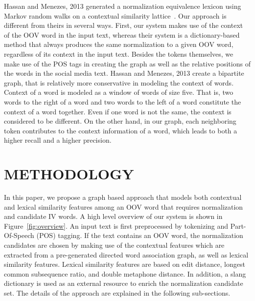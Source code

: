\documentclass[a4paper,onesided,12pt]{report}
\begin{document}
Hassan and Menezes, 2013 generated a normalization equivalence lexicon using Markov random walks on a contextual similarity lattice~\cite{DBLP:conf/acl/HassanM13}. Our approach is different from theirs in several ways. First, our system makes use of the context of the OOV word in the input text, whereas their system is a dictionary-based method that always produces the same normalization to a given OOV word, regardless of its context in the input text. Besides the tokens themselves, we make use of the POS tags in creating the graph as well as the relative positions of the words in the social media text. Hassan and Menezes, 2013 create a bipartite graph, that is relatively more conservative in modeling the context of words. Context of a word is modeled as a window of words of size five. That is, two words to the right of a word and two words to the left of a word constitute the context of a word together. Even if one word is not the same, the context is considered to be different. On the other hand, in our graph, each neighboring token contributes to the context information of a word, which leads to both a higher recall and a higher precision.



\chapter{METHODOLOGY}
\label{chapter:method}



In this paper, we propose a graph based approach that models both contextual and lexical similarity features among an OOV word that requires normalization and candidate IV words. A high level overview of our system is shown in Figure~\ref{fig:overview}. An input text is first preprocessed by tokenizing and Part-Of-Speech (POS) tagging. If the text contains an OOV word, the normalization candidates are chosen by making use of the contextual features which are extracted from a pre-generated directed word association graph, as well as lexical similarity features. Lexical similarity features are based on edit distance, longest common subsequence ratio, and double metaphone distance. In addition, a slang dictionary is used as an external resource to enrich the normalization candidate set. The details of the approach are explained in the following sub-sections.
\end{document}
